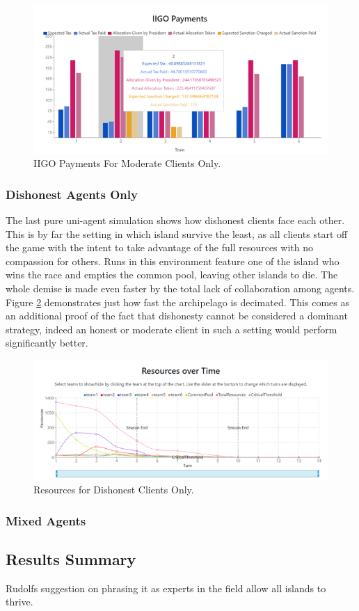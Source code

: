 \begin{figure}[H]
\centering
\includegraphics[scale=0.8]{12_team4_agentdesign/images/IIGOMM.png}
\caption{IIGO Payments For Moderate Clients Only.}
\label{fig:IIGOMM}
\end{figure}

\subsubsection{Dishonest Agents Only} \label{dishonestAD}
The last pure uni-agent simulation shows how dishonest clients face each other. This is by far the setting in which island survive the least, as all clients start off the game with the intent to take advantage of the full resources with no compassion for others. Runs in this environment feature one of the island who wins the race and empties the common pool, leaving other islands to die. The whole demise is made even faster by the total lack of collaboration among agents. Figure \ref{fig:ResourcesDD} demonstrates just how fast the archipelago is decimated.
This comes as an additional proof of the fact that dishonesty cannot be considered a dominant strategy, indeed an honest or moderate client in such a setting would perform significantly better.
\begin{figure}[H]
\centering
\includegraphics[scale=0.8]{12_team4_agentdesign/images/ResourcesDD.png}
\caption{Resources for Dishonest Clients Only.}
\label{fig:ResourcesDD}
\end{figure}
\subsubsection{Mixed Agents}

\subsection{Results Summary} \label{ResultSummary}
Rudolfs suggestion on phrasing it as experts in the field allow all islands to thrive. 
